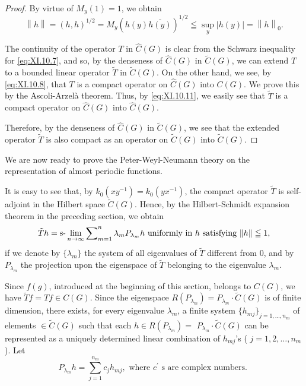 \begin{proof}
 By virtue of $M_y(1) = 1$, we obtain 
\begin{equation}\label{eq:XI.10.11}
\left\| h \right\| = (h, h) ^{1/2} = M _{y} (h (y) \overline {{{{h (y)}}}}) ^{1/2} \leqq \sup\limits _{y} | h (y) | = \left\| h \right\| _{0}. \end{equation}

The continuity of the operator $T$ in $\hat{C}(G)$ is clear from the Schwarz inequality for \eqref{eq:XI.10.7}, and so, by the denseness of $\hat{C}(G)$ in $\tilde{C}(G)$, we can extend $T$ to a bounded linear operator $\tilde{T}$ in $\tilde{C}(G)$. On the other hand, we see, by \eqref{eq:XI.10.8}, that $T$ is a compact operator on $\hat{C}(G)$ into $C(G)$. We prove this by the Ascoli-Arzelà theorem. Thus, by \eqref{eq:XI.10.11}, we easily see that $\tilde{T}$ is a compact operator on $\hat{C}(G)$ into $\hat{C}(G)$. 

Therefore, by the denseness of $\hat{C}(G)$ in $\tilde{C}(G)$, we see that the extended operator $\tilde{T}$ is also compact as an operator on $\tilde{C}(G)$ into $\tilde{C}(G)$. 
\end{proof}

We are now ready to prove the Peter-Weyl-Neumann theory on the representation of almost periodic functions. 

It is easy to see that, by $k_{0}(xy^{-1}) = k_{0}(yx^{-1})$, the compact operator $\tilde{T}$ is self-adjoint in the Hilbert space $\tilde{C}(G)$. Hence, by the Hilbert-Schmidt expansion theorem in the preceding section, we obtain 
\begin{equation}\label{eq:XI.10.12}
\tilde {T} h = \text{s-}\lim _{n \to \infty} \sum\nolimits_{m=1} ^{n} \lambda_{m} P _ {\lambda_{m}} h \text{ uniformly in } h \text{ satisfying } \| h \| \leqq 1,
\end{equation}
if we denote by $\{\lambda_{m}\}$ the system of all eigenvalues of $\tilde{T}$ different from $0$, and by $P_{\lambda_{m}}$ the projection upon the eigenspace of $\tilde{T}$ belonging to the eigenvalue $\lambda_{m}$. 

Since $f(g)$, introduced at the beginning of this section, belongs to $C(G)$, we have $\tilde{T}f = Tf \in C(G)$. Since the eigenspace $R(P_{\lambda_m}) = P_{\lambda_m} \cdot \tilde{C}(G)$ is of finite dimension, there exists, for every eigenvalue $\lambda_m$, a finite system $\{h_{mj}\}_{j=1,\ldots,n_m}$ of elements $\in \tilde{C}(G)$ such that each $h \in R(P_{\lambda_m}) =$ 
$P_{\lambda_m} \cdot \tilde{C}(G)$ can be represented as a uniquely determined linear combination of $h_{mj}$'s ( $j = 1, 2, \ldots, n_m$). Let 
\begin{equation}\label{eq:XI.10.13}
P _ {\lambda_{m}} h = \sum\limits_{j=1} ^ {n _{m}} c _{j} h _{mj}, \text{ where } c ^{\prime} \text{ s are complex numbers. }
\end{equation}

